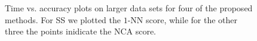       \begin{figure}
		\centering
		\caption{\small Time vs. accuracy plots on larger data sets for four of the proposed methods. For SS we plotted the $1$-NN score, while for the other three the points inidicate the NCA score.}
		\label{fig:time-accuracy}
      \end{figure}

